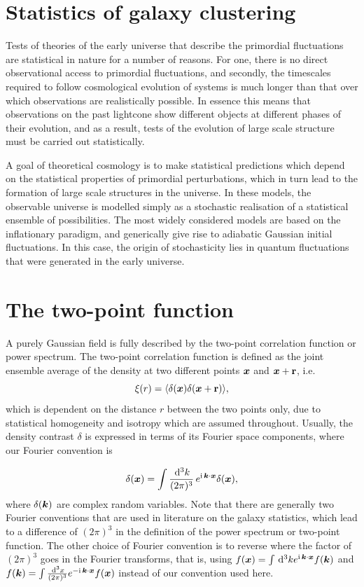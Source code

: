 \section{Statistics of galaxy clustering}
\label{section:introbisp} 

Tests of theories of the early universe that describe the primordial fluctuations are statistical in nature for a number of reasons. For one, there is no direct observational access to primordial fluctuations, and secondly, the timescales required to follow cosmological evolution of systems is much longer than that over which observations are realistically possible. In essence this means that observations on the past lightcone show different objects at different phases of their evolution, and as a result, tests of the evolution of large scale structure must be carried out statistically. 

A goal of theoretical cosmology is to make statistical predictions which depend on the statistical properties of primordial perturbations, which in turn lead to the formation of large scale structures in the universe. In these models, the observable universe is modelled simply as a stochastic realisation of a statistical ensemble of possibilities. The most widely considered models are based on the inflationary paradigm, and generically give rise to adiabatic Gaussian initial fluctuations. In this case, the origin of stochasticity lies in quantum fluctuations that were generated in the early universe. 

\section{The two-point function}

A purely Gaussian field is fully described by the two-point correlation function or power spectrum. The two-point correlation function is defined as the joint ensemble average of the density at two different points $\bm {x}$ and $\bm {x} + \textbf{r}$, i.e. 
\begin{equation}
	\xi(r) = \langle \delta(\bm {x}) \delta(\bm {x} + \textbf{r}) \rangle,
\end{equation}
which is dependent on the distance $r$ between the two points only, due to statistical homogeneity and isotropy which are assumed throughout. Usually, the density contrast $\delta$ is expressed in terms of its Fourier space components, where our Fourier convention is 

\begin{equation}
	\delta({\bm {x}}) = \int \frac{\,\mathrm{d}^3k}{(2\pi)^3} \, e^{\mathrm{i\,} \bm {k} \cdot \bm {x} } \delta(\bm {x}),
\end{equation}
where $\delta(\bm {k})$ are complex random variables. Note that there are generally two Fourier conventions that are used in literature on the galaxy statistics, which lead to a difference of $(2\pi)^3$ in the definition of the power spectrum or two-point function. The other choice of Fourier convention is to reverse where the factor of $(2\pi)^3$ goes in the Fourier transforms, that is, using $f(\bm {x}) = \int \,\mathrm{d}^3k e^{\mathrm{i\,} \bm {k} \cdot \bm {x}} f(\bm {k}) $ and $f(\bm {k}) = \int \frac{\,\mathrm{d}^3 x}{(2\pi)^3} e^{-\mathrm{i\,} \bm {k} \cdot \bm {x}} f(\bm {x})$ instead of our convention used here.

